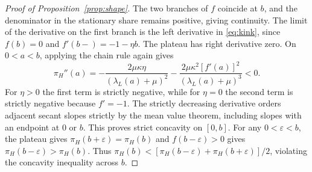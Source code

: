 \documentclass[11pt]{article}
\theoremstyle{definition}
\newcommand{\lam}{\lambda_L}
\newcommand{\share}{\pi_H}
\begin{document}
\begin{proof}[Proof of Proposition~\ref{prop:shape}]
The two branches of $f$ coincide at $b$, and the denominator in the
stationary share remains positive, giving continuity. The limit of the
derivative on the first branch is the left derivative in \eqref{eq:kink},
since $f(b)=0$ and $f'(b-)=-1-\eta b$. The plateau has right derivative
zero. On $0<a<b$, applying the chain rule again gives
\begin{equation}\label{eq:second}
 \share''(a)
 =-\frac{2\mu\kappa\eta}{(\lam(a)+\mu)^2}
  -\frac{2\mu\kappa^2[f'(a)]^2}{(\lam(a)+\mu)^3}<0 .
\end{equation}
For $\eta>0$ the first term is strictly negative, while for $\eta=0$
the second term is strictly negative because $f'=-1$. The strictly
decreasing derivative orders adjacent secant slopes strictly by the
mean value theorem, including slopes with an endpoint at $0$ or $b$.
This proves strict concavity on $[0,b]$. For any $0<\varepsilon<b$,
the plateau gives $\share(b+\varepsilon)=\share(b)$ and
$f(b-\varepsilon)>0$ gives $\share(b-\varepsilon)>\share(b)$. Thus
$\share(b)<[\share(b-\varepsilon)+\share(b+\varepsilon)]/2$, violating
the concavity inequality across $b$.
\end{proof}
\end{document}
